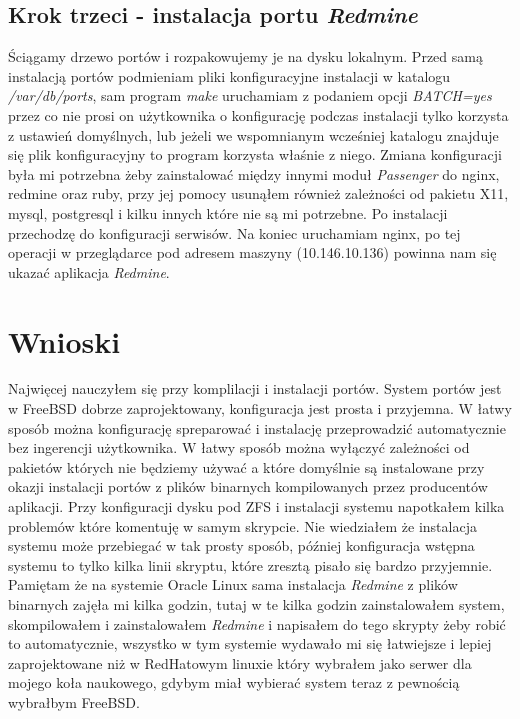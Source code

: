 \documentclass[a4paper,11pt,notitlepage]{article}
\begin{document}
\subsection{Krok trzeci - instalacja portu \textit{Redmine}}

Ściągamy drzewo portów i rozpakowujemy je na dysku lokalnym. Przed samą instalacją portów podmieniam pliki konfiguracyjne instalacji w katalogu \textit{/var/db/ports}, sam program \textit{make} uruchamiam z podaniem opcji \textit{BATCH=yes} przez co nie prosi on użytkownika o konfigurację podczas instalacji tylko korzysta z ustawień domyślnych, lub jeżeli we wspomnianym wcześniej katalogu znajduje się plik konfiguracyjny to program korzysta właśnie z niego. Zmiana konfiguracji była mi potrzebna żeby zainstalować między innymi moduł \textit{Passenger} do nginx, redmine oraz ruby, przy jej pomocy usunąłem również zależności od pakietu X11, mysql, postgresql i kilku innych które nie są mi potrzebne.\newline
\indent
Po instalacji przechodzę do konfiguracji serwisów. Na koniec uruchamiam nginx, po tej operacji w przeglądarce pod adresem maszyny (10.146.10.136) powinna nam się ukazać aplikacja \textit{Redmine}.


\section{Wnioski}

Najwięcej nauczyłem się przy komplilacji i instalacji portów. System portów jest w FreeBSD dobrze zaprojektowany, konfiguracja jest prosta i przyjemna. W łatwy sposób można konfigurację spreparować i instalację przeprowadzić automatycznie bez ingerencji użytkownika. W łatwy sposób można wyłączyć zależności od pakietów których nie będziemy używać a które domyślnie są instalowane przy okazji instalacji portów z plików binarnych kompilowanych przez producentów aplikacji. \newline
\indent
Przy konfiguracji dysku pod ZFS i instalacji systemu napotkałem kilka problemów które komentuję w samym skrypcie. Nie wiedziałem że instalacja systemu może przebiegać w tak prosty sposób, później konfiguracja wstępna systemu to tylko kilka linii skryptu, które zresztą pisało się bardzo przyjemnie. Pamiętam że na systemie Oracle Linux sama instalacja \textit{Redmine} z plików binarnych zajęła mi kilka godzin, tutaj w te kilka godzin zainstalowałem system, skompilowałem i zainstalowałem \textit{Redmine} i napisałem do tego skrypty żeby robić to automatycznie, wszystko w tym systemie wydawało mi się łatwiejsze i lepiej zaprojektowane niż w RedHatowym linuxie który wybrałem jako serwer dla mojego koła naukowego, gdybym miał wybierać system teraz z pewnością wybrałbym FreeBSD.
\end{document}
